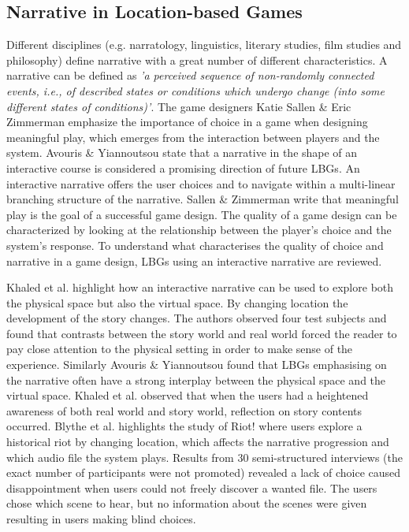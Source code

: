 \subsection{Narrative in Location-based Games}
Different disciplines (e.g. narratology, linguistics, literary studies, film studies and philosophy) define narrative with a great number of different characteristics\cite{Grimaldi}. A narrative can be defined as \emph{'a perceived sequence of non-randomly connected events, i.e., of described states or conditions which undergo change (into some different states of conditions)'}\cite{narrativeDef}. The game designers Katie Sallen \& Eric Zimmerman emphasize the importance of choice in a game when designing meaningful play, which emerges from the interaction between players and the system\cite{RulesofPlay}. Avouris \& Yiannoutsou state that a narrative in the shape of an interactive course is considered a promising direction of future LBGs\cite{LBG_Review}. An interactive narrative offers the user choices and to navigate within a multi-linear branching structure of the narrative\cite{ryanavatars}. Sallen \& Zimmerman write that meaningful play is the goal of a successful game design. The quality of a game design can be characterized by looking at the relationship between the player’s choice and the system’s response\cite{RulesofPlay}. To understand what characterises the quality of choice and narrative in a game design, LBGs using an interactive narrative are reviewed.

Khaled et al. highlight how an interactive narrative can be used to explore both the physical space but also the virtual space. By changing location the development of the story changes. The authors observed four test subjects and found that contrasts between the story world and real world forced the reader to pay close attention to the physical setting in order to make sense of the experience\cite{StoryTrek}. Similarly Avouris \& Yiannoutsou found that LBGs emphasising on the narrative often have a strong interplay between the physical space and the virtual space\cite{LBG_Review}. Khaled et al. observed that when the users had a heightened awareness of both real world and story world, reflection on story contents occurred\cite{StoryTrek}. Blythe et al. highlights the study of Riot! where users explore a historical riot by changing location, which affects the narrative progression and which audio file the system plays. Results from 30 semi-structured interviews (the exact number of participants were not promoted) revealed a lack of choice caused disappointment when users could not freely discover a wanted file. The users chose which scene to hear, but no information about the scenes were given resulting in users making blind choices\cite{InterdisciplinaryCriticism}.